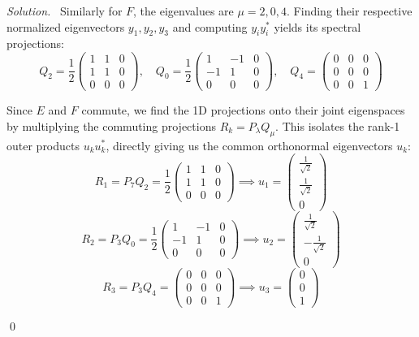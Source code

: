 \documentclass[12pt,a4paper]{article}
\newenvironment{solution}{%
  \par\noindent\textit{Solution.}\ }{\qed}
\theoremstyle{problemstyle}
\begin{document}
\begin{solution}
Similarly for \( F \), the eigenvalues are \( \mu = 2, 0, 4 \). Finding their respective normalized eigenvectors \( y_1, y_2, y_3 \) and computing \( y_i y_i^* \) yields its spectral projections:
\[ Q_2 = \frac{1}{2}\begin{pmatrix} 1 & 1 & 0 \\ 1 & 1 & 0 \\ 0 & 0 & 0 \end{pmatrix}, \quad Q_0 = \frac{1}{2}\begin{pmatrix} 1 & -1 & 0 \\ -1 & 1 & 0 \\ 0 & 0 & 0 \end{pmatrix}, \quad Q_4 = \begin{pmatrix} 0 & 0 & 0 \\ 0 & 0 & 0 \\ 0 & 0 & 1 \end{pmatrix} \]

Since \( E \) and \( F \) commute, we find the 1D projections onto their joint eigenspaces by multiplying the commuting projections \( R_k = P_{\lambda} Q_{\mu} \). This isolates the rank-1 outer products \( u_k u_k^* \), directly giving us the common orthonormal eigenvectors \( u_k \):
\[ R_1 = P_7 Q_2 = \frac{1}{2}\begin{pmatrix} 1 & 1 & 0 \\ 1 & 1 & 0 \\ 0 & 0 & 0 \end{pmatrix} \implies u_1 = \begin{pmatrix} \frac{1}{\sqrt{2}} \\ \frac{1}{\sqrt{2}} \\ 0 \end{pmatrix} \]
\[ R_2 = P_3 Q_0 = \frac{1}{2}\begin{pmatrix} 1 & -1 & 0 \\ -1 & 1 & 0 \\ 0 & 0 & 0 \end{pmatrix} \implies u_2 = \begin{pmatrix} \frac{1}{\sqrt{2}} \\ -\frac{1}{\sqrt{2}} \\ 0 \end{pmatrix} \]
\[ R_3 = P_3 Q_4 = \begin{pmatrix} 0 & 0 & 0 \\ 0 & 0 & 0 \\ 0 & 0 & 1 \end{pmatrix} \implies u_3 = \begin{pmatrix} 0 \\ 0 \\ 1 \end{pmatrix} \]


\end{solution}
\end{document}
